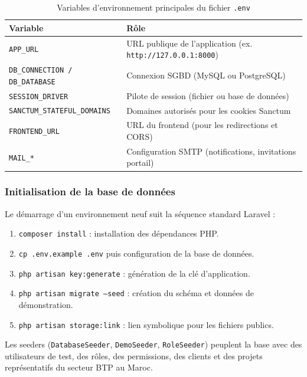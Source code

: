 \begin{table}[H]
\caption{Variables d'environnement principales du fichier \texttt{.env}}
\label{tab:env_vars}
\centering
\small
\begin{tabular}{|l|p{7.5cm}|}
\hline
\textbf{Variable} & \textbf{Rôle} \\
\hline
\texttt{APP\_URL} & URL publique de l'application (ex. \texttt{http://127.0.0.1:8000}) \\
\hline
\texttt{DB\_CONNECTION / DB\_DATABASE} & Connexion SGBD (MySQL ou PostgreSQL) \\
\hline
\texttt{SESSION\_DRIVER} & Pilote de session (fichier ou base de données) \\
\hline
\texttt{SANCTUM\_STATEFUL\_DOMAINS} & Domaines autorisés pour les cookies Sanctum \\
\hline
\texttt{FRONTEND\_URL} & URL du frontend (pour les redirections et CORS) \\
\hline
\texttt{MAIL\_*} & Configuration SMTP (notifications, invitations portail) \\
\hline
\end{tabular}
\end{table}

\subsubsection{Initialisation de la base de données}

Le démarrage d'un environnement neuf suit la séquence standard Laravel :

\begin{enumerate}
  \item \texttt{composer install} : installation des dépendances PHP.
  \item \texttt{cp .env.example .env} puis configuration de la base de données.
  \item \texttt{php artisan key:generate} : génération de la clé d'application.
  \item \texttt{php artisan migrate --seed} : création du schéma et données de démonstration.
  \item \texttt{php artisan storage:link} : lien symbolique pour les fichiers publics.
\end{enumerate}

Les seeders (\texttt{DatabaseSeeder}, \texttt{DemoSeeder}, \texttt{RoleSeeder}) peuplent
la base avec des utilisateurs de test, des rôles, des permissions, des clients et des
projets représentatifs du secteur BTP au Maroc.

